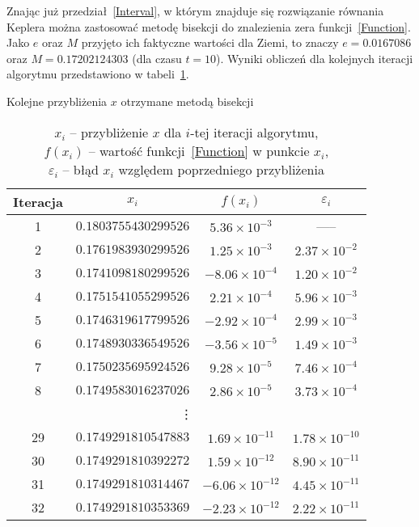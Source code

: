 \documentclass[11pt,wide,leqno]{article}
\begin{document}
        Znając już przedział~\eqref{Interval}, w którym znajduje się rozwiązanie równania Keplera
        można zastosować metodę bisekcji do znalezienia zera funkcji~\eqref{Function}. 
        Jako \(e\) oraz \(M\) przyjęto ich faktyczne wartości dla
        Ziemi, to znaczy \(e = 0.0167086\) oraz \(M = 0.17202124303\)
        (dla czasu \(t = 10\)). Wyniki obliczeń 
        dla kolejnych iteracji algorytmu przedstawiono
        w tabeli~\ref{table:one}.
        \begin{table}[h]
            \centering
            \caption{Kolejne przybliżenia \(x\) otrzymane metodą bisekcji}\label{table:one}
            \renewcommand{\arraystretch}{1.5}
            \begin{tabular}{|c|c|c|c|}\hline
                Iteracja & \(x_i\) & \(f(x_i)\) & \(\varepsilon_i\) \\ \hline
                1 & \(0.1803755430299526\) & \(5.36 \times 10^{-3}\) & ----- \\ \hline
                2 & \(0.1761983930299526\) & \(1.25 \times 10^{-3}\) & \(2.37 \times 10^{-2}\) \\ \hline
                3 & \(0.1741098180299526\) & \(-8.06 \times 10^{-4}\) & \(1.20 \times 10^{-2}\)\\ \hline
                4 & \(0.1751541055299526\) & \(2.21 \times 10^{-4}\) & \(5.96 \times 10^{-3}\)\\ \hline
                5 & \(0.1746319617799526\) & \(-2.92 \times 10^{-4}\) & \(2.99 \times 10^{-3}\) \\ \hline
                6 & \(0.1748930336549526\) & \(-3.56 \times 10^{-5}\) & \(1.49 \times 10^{-3}\) \\ \hline
                7 & \(0.1750235695924526\) & \(9.28 \times 10^{-5}\) & \(7.46 \times 10^{-4}\) \\ \hline
                8 & \(0.1749583016237026\) & \(2.86 \times 10^{-5}\) & \(3.73 \times 10^{-4}\) \\ \hline
                \multicolumn{4}{c}{\vdots} \\ \hline
                29 & \(0.1749291810547883\) & \(1.69 \times 10^{-11}\) & \(1.78 \times 10^{-10}\) \\ \hline
                30 & \(0.1749291810392272\) & \(1.59 \times 10^{-12}\) & \(8.90 \times 10^{-11}\) \\ \hline
                31 & \(0.1749291810314467\) & \(-6.06 \times 10^{-12}\) & \(4.45 \times 10^{-11}\) \\ \hline
                32 & \(0.1749291810353369\) & \(-2.23 \times 10^{-12}\) & \(2.22 \times 10^{-11}\) \\ \hline
            \end{tabular}
            \caption*{
            \(x_i\) -- przybliżenie \(x\) dla \(i\)-tej iteracji algorytmu, \\
            \(f(x_i)\) -- wartość funkcji~\eqref{Function} w punkcie \(x_i\), \\
            \(\varepsilon_i\) -- błąd \(x_i\) względem poprzedniego przybliżenia}
        \end{table}
        
\end{document}

